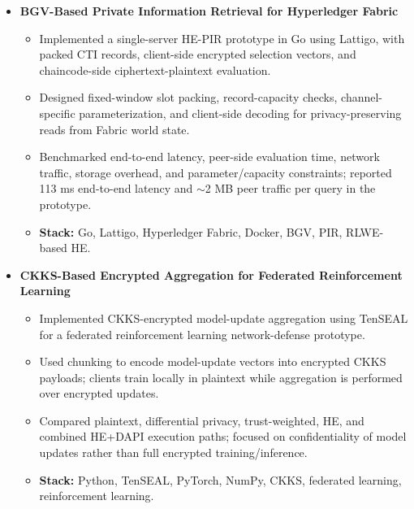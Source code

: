 \documentclass[10.5pt,letterpaper]{article}
\begin{document}
\begin{itemize}[leftmargin=0em, itemsep=0.45em]
    \renewcommand\labelitemi{}

    \item
    \textbf{BGV-Based Private Information Retrieval for Hyperledger Fabric}
    \begin{itemize}[leftmargin=1.2em, itemsep=0.05em]
        \renewcommand\labelitemi{$\bullet$}
        \item Implemented a single-server HE-PIR prototype in Go using Lattigo, with packed CTI records, client-side encrypted selection vectors, and chaincode-side ciphertext-plaintext evaluation.
        \item Designed fixed-window slot packing, record-capacity checks, channel-specific parameterization, and client-side decoding for privacy-preserving reads from Fabric world state.
        \item Benchmarked end-to-end latency, peer-side evaluation time, network traffic, storage overhead, and parameter/capacity constraints; reported 113 ms end-to-end latency and $\sim$2 MB peer traffic per query in the prototype.
        \item \textbf{Stack:} Go, Lattigo, Hyperledger Fabric, Docker, BGV, PIR, RLWE-based HE.
    \end{itemize}

    \item
    \textbf{CKKS-Based Encrypted Aggregation for Federated Reinforcement Learning}
    \begin{itemize}[leftmargin=1.2em, itemsep=0.05em]
        \renewcommand\labelitemi{$\bullet$}
        \item Implemented CKKS-encrypted model-update aggregation using TenSEAL for a federated reinforcement learning network-defense prototype.
        \item Used chunking to encode model-update vectors into encrypted CKKS payloads; clients train locally in plaintext while aggregation is performed over encrypted updates.
        \item Compared plaintext, differential privacy, trust-weighted, HE, and combined HE+DAPI execution paths; focused on confidentiality of model updates rather than full encrypted training/inference.
        \item \textbf{Stack:} Python, TenSEAL, PyTorch, NumPy, CKKS, federated learning, reinforcement learning.
    \end{itemize}

\end{itemize}
\end{document}
